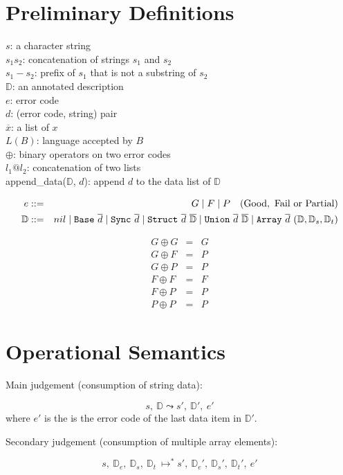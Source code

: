 \documentclass[11pt]{article}
\renewcommand{\bar}[1]{\overline #1}
\newcommand{\base}{{\tt Base}}
\newcommand{\sync}{{\tt Sync}}
\newcommand{\mystruct}{{\tt Struct}}
\newcommand{\myunion}{{\tt Union}}
\newcommand{\myarray}{{\tt Array}}
\newcommand{\D}{{\mathbb D}}
\newcommand{\pa}{{\mapsto^*}}
\begin{document}
\section{Preliminary Definitions}

\noindent
$s$: a character string \\
$s_1 s_2$: concatenation of strings $s_1$ and $s_2$\\
$s_1 - s_2$: prefix of $s_1$ that is not a substring of $s_2$ \\
$\D$: an annotated description \\
$e$: error code \\
$d$: (error code, string) pair\\
$\bar x$: a list of $x$ \\
$L(B)$: language accepted by $B$\\
$\oplus$: binary operators on two error codes\\
$l_1 @ l_2$: concatenation of two lists\\
append\_data($\D$, $d$): append $d$ to the data list of $\D$

\begin{eqnarray*}
e &::=& G \bnfalt F \bnfalt P ~~~ {\rm (Good,~ Fail~ or~ Partial)}\\
\D &::=& nil \bnfalt \base~ \bar{d} \bnfalt \sync~ \bar{d} \bnfalt \mystruct~ \bar{d}~  \bar{\D} \bnfalt 
\myunion~ \bar{d}~ \bar{\D} \bnfalt \myarray~ \bar{d}~ (\D, \D_s, \D_t)
\end{eqnarray*}

\begin{eqnarray*}
G \oplus G &=& G\\
G \oplus F &=& P\\
G \oplus P &=& P\\
F \oplus F &=& F\\
F \oplus P &=& P\\
P \oplus P &=& P
\end{eqnarray*}

\section{Operational Semantics}
Main judgement (consumption of string data):

\[s,~ \D \leadsto s',~ \D',~ e'
\]
\noindent
where $e'$ is the is the error code of the last data item in $\D'$.

\noindent
Secondary judgement (consumption of multiple array elements):

\[
s, ~\D_e,~ \D_s,~ \D_t~ \pa s',~ \D_e',~ \D_s',~ \D_t',~ e'
\]
\end{document}

